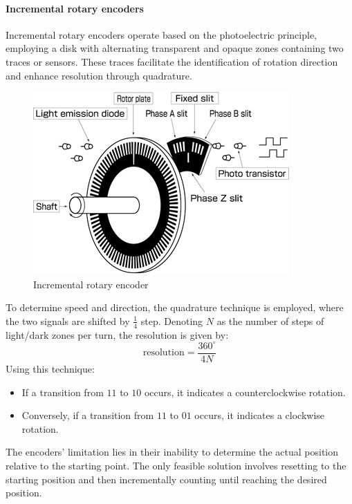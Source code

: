 \paragraph*{Incremental rotary encoders}
Incremental rotary encoders operate based on the photoelectric principle, employing a disk with alternating transparent and opaque zones containing two traces or sensors.
These traces facilitate the identification of rotation direction and enhance resolution through quadrature.
\begin{figure}[H]
    \centering
    \includegraphics[width=0.35\linewidth]{images/rotary1.png}
    \caption{Incremental rotary encoder}
\end{figure}
To determine speed and direction, the quadrature technique is employed, where the two signals are shifted by $\frac{1}{4}$ step. 
Denoting $N$ as the number of steps of light/dark zones per turn, the resolution is given by:
\[\text{resolution}=\dfrac{360^{\circ}}{4N}\]
Using this technique:
\begin{itemize}
    \item If a transition from $1 1$ to $1 0$ occurs, it indicates a counterclockwise rotation.
    \item Conversely, if a transition from $1 1$ to $0 1$ occurs, it indicates a clockwise rotation.
\end{itemize}

The encoders' limitation lies in their inability to determine the actual position relative to the starting point.
The only feasible solution involves resetting to the starting position and then incrementally counting until reaching the desired position.

